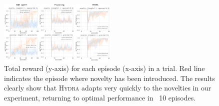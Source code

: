 \documentclass[sigconf]{aamas}
\newcommand{\hydra}{\textsc{Hydra}\xspace} %
\begin{document}
\begin{figure}
    \centering
    \includegraphics[width=0.5\textwidth]{figures/experiments/compiled-results.pdf} 
    \caption{Total reward (y-axis) for each episode (x-axis) in a trial. Red line indicates the episode where novelty has been introduced. 
    	The results clearly show that \hydra adapts very quickly to the novelties in our experiment, returning to optimal performance in ~10 episodes.
    	 }
    \label{fig:combined-results}
\end{figure}










\end{document}
